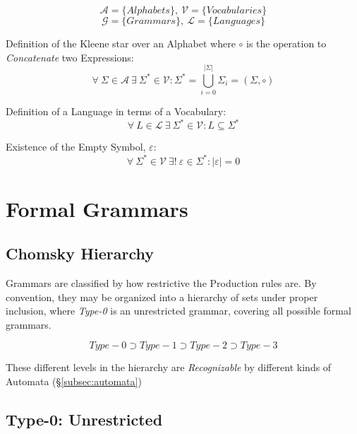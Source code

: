 \documentclass{article}
\begin{document}
\[
    \mathcal{A} = \{ Alphabets \},\: \mathcal{V} = \{ Vocabularies \}
\] \[
    \mathcal{G} = \{ Grammars \},\: \mathcal{L} = \{ Languages \}
\]

    \begin{description}

    \item Definition of the Kleene star over an
      Alphabet where $\circ$ is the operation to \emph{Concatenate} two
      Expressions:
    \[
        \forall \: \Sigma \in \mathcal{A} \:
        \exists \: \Sigma^* \in \mathcal{V}
        : \Sigma^* = \bigcup_{i=0}^{|\Sigma|} \Sigma_i
        = (\Sigma,\circ)
    \]

    \item Definition of a Language in terms of a Vocabulary:
    \[
        \forall \: L \in \mathcal{L} \:
        \exists \: \Sigma^* \in \mathcal{V}
        : L \subseteq \Sigma^*
    \]

    \item Existence of the Empty Symbol, $\varepsilon$:
    \[
        \forall \: \Sigma^* \in \mathcal{V} \:
        \exists ! \: \varepsilon \in \Sigma^*
        : |\varepsilon|=0
    \]

    \end{description}

\section{Formal Grammars}

\subsection{Chomsky Hierarchy}

Grammars are classified by how restrictive the Production rules
are. By convention, they may be organized into a hierarchy of sets
under proper inclusion, where \emph{Type-0} is an unrestricted grammar,
covering all possible formal grammars.

\[
    Type-0 \supset Type-1 \supset Type-2 \supset Type-3
\]

These different levels in the hierarchy are \emph{Recognizable} by
different kinds of Automata (\S \ref{subsec:automata})

\subsection{Type-0: Unrestricted}
\end{document}
